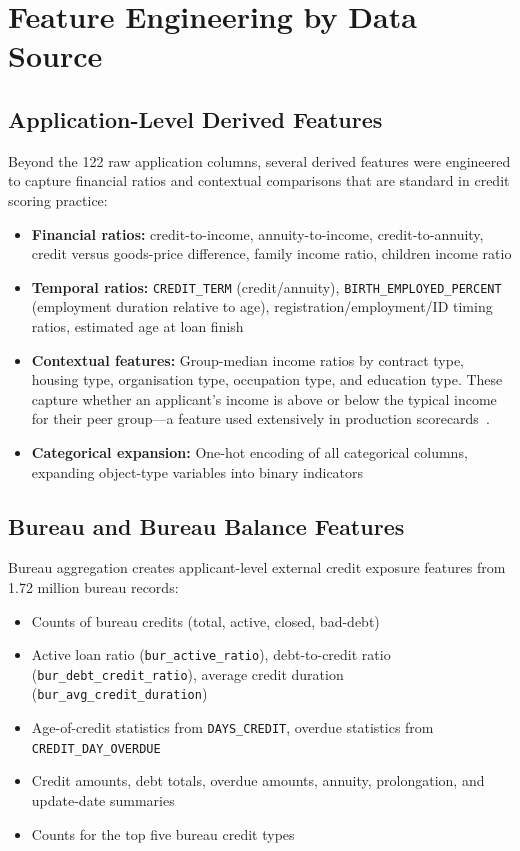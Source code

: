 \section{Feature Engineering by Data Source}
\label{sec:feature_by_source}

\subsection{Application-Level Derived Features}

Beyond the 122 raw application columns, several derived features were engineered to capture financial ratios and contextual comparisons that are standard in credit scoring practice:

\begin{itemize}
    \item \textbf{Financial ratios:} credit-to-income, annuity-to-income, credit-to-annuity, credit versus goods-price difference, family income ratio, children income ratio
    \item \textbf{Temporal ratios:} \texttt{CREDIT\_TERM} (credit/annuity), \texttt{BIRTH\_EMPLOYED\_PERCENT} (employment duration relative to age), registration/employment/ID timing ratios, estimated age at loan finish
    \item \textbf{Contextual features:} Group-median income ratios by contract type, housing type, organisation type, occupation type, and education type. These capture whether an applicant's income is above or below the typical income for their peer group---a feature used extensively in production scorecards~\cite{siddiqi2012}.
    \item \textbf{Categorical expansion:} One-hot encoding of all categorical columns, expanding object-type variables into binary indicators
\end{itemize}

\subsection{Bureau and Bureau Balance Features}

Bureau aggregation creates applicant-level external credit exposure features from 1.72 million bureau records:

\begin{itemize}
    \item Counts of bureau credits (total, active, closed, bad-debt)
    \item Active loan ratio (\texttt{bur\_active\_ratio}), debt-to-credit ratio (\texttt{bur\_debt\_credit\_ratio}), average credit duration (\texttt{bur\_avg\_credit\_duration})
    \item Age-of-credit statistics from \texttt{DAYS\_CREDIT}, overdue statistics from \texttt{CREDIT\_DAY\_OVERDUE}
    \item Credit amounts, debt totals, overdue amounts, annuity, prolongation, and update-date summaries
    \item Counts for the top five bureau credit types
\end{itemize}

